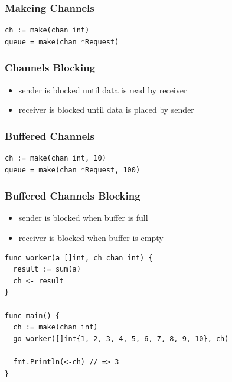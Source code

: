 \documentclass[xetex,mathserif,serif,12pt]{beamer}
\begin{document}
\begin{frame}[fragile]
  \frametitle{Makeing Channels}
  \begin{beamer@nomargin}
    \begin{lstlisting}
ch := make(chan int)
queue = make(chan *Request)
    \end{lstlisting}
  \end{beamer@nomargin}
\end{frame}

\begin{frame}
  \frametitle{Channels Blocking}

  \begin{itemize}
  \item sender is blocked until data is read by receiver
  \item receiver is blocked until data is placed by sender
  \end{itemize}
\end{frame}

\begin{frame}[fragile]
  \frametitle{Buffered Channels}
  \begin{beamer@nomargin}
    \begin{lstlisting}
ch := make(chan int, 10)
queue = make(chan *Request, 100)
    \end{lstlisting}
  \end{beamer@nomargin}
\end{frame}

\begin{frame}
  \frametitle{Buffered Channels Blocking}

  \begin{itemize}
  \item sender is blocked when buffer is full
  \item receiver is blocked when buffer is empty
  \end{itemize}
\end{frame}

\begin{frame}[fragile]
  \begin{beamer@nomargin}
    \begin{lstlisting}
func worker(a []int, ch chan int) {
  result := sum(a)
  ch <- result
}

func main() {
  ch := make(chan int)
  go worker([]int{1, 2, 3, 4, 5, 6, 7, 8, 9, 10}, ch)

  fmt.Println(<-ch) // => 3
}
    \end{lstlisting}
  \end{beamer@nomargin}
\end{frame}
\end{document}
